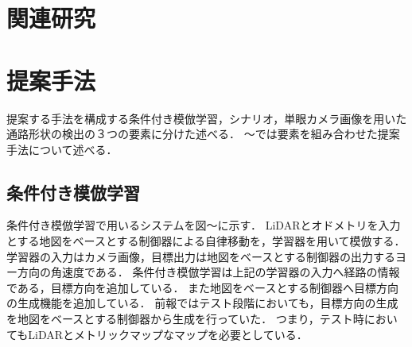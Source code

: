\documentclass{jarticle}
\begin{document}
\section{関連研究}
\section{提案手法}
提案する手法を構成する条件付き模倣学習，シナリオ，単眼カメラ画像を用いた通路形状の検出の３つの要素に分けた述べる．
〜では要素を組み合わせた提案手法について述べる．
\subsection{条件付き模倣学習}
条件付き模倣学習で用いるシステムを図〜に示す．
LiDARとオドメトリを入力とする地図をベースとする制御器による自律移動を，学習器を用いて模倣する．
学習器の入力はカメラ画像，目標出力は地図をベースとする制御器の出力するヨー方向の角速度である．
条件付き模倣学習は上記の学習器の入力へ経路の情報である，目標方向を追加している．
また地図をベースとする制御器へ目標方向の生成機能を追加している．
前報ではテスト段階においても，目標方向の生成を地図をベースとする制御器から生成を行っていた．
つまり，テスト時においてもLiDARとメトリックマップなマップを必要としている．
\end{document}
